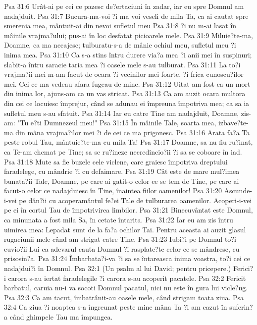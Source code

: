 Psa 31:6  Urât-ai pe cei ce pazesc de?ertaciuni în zadar, iar eu spre Domnul am nadajduit.
Psa 31:7  Bucura-ma-voi ?i ma voi veseli de mila Ta, ca ai cautat spre smerenia mea, mântuit-ai din nevoi sufletul meu
Psa 31:8  ?i nu m-ai lasat în mâinile vrajma?ului; pus-ai în loc desfatat picioarele mele.
Psa 31:9  Miluie?te-ma, Doamne, ca ma necajesc; tulburatu-s-a de mânie ochiul meu, sufletul meu ?i inima mea.
Psa 31:10  Ca s-a stins întru durere via?a mea ?i anii mei în suspinuri; slabit-a întru saracie taria mea ?i oasele mele s-au tulburat.
Psa 31:11  La to?i vrajma?ii mei m-am facut de ocara ?i vecinilor mei foarte, ?i frica cunoscu?ilor mei. Cei ce ma vedeau afara fugeau de mine.
Psa 31:12  Uitat am fost ca un mort din inima lor, ajuns-am ca un vas stricat.
Psa 31:13  Ca am auzit ocara multora din cei ce locuiesc împrejur, când se adunau ei împreuna împotriva mea; ca sa ia sufletul meu s-au sfatuit.
Psa 31:14  Iar eu catre Tine am nadajduit, Doamne, zis-am: "Tu e?ti Dumnezeul meu!"
Psa 31:15  În mâinile Tale, soarta mea, izbave?te-ma din mâna vrajma?ilor mei ?i de cei ce ma prigonesc.
Psa 31:16  Arata fa?a Ta peste robul Tau, mântuie?te-ma cu mila Ta!
Psa 31:17  Doamne, sa nu fiu ru?inat, ca Te-am chemat pe Tine; sa se ru?ineze necredincio?ii ?i sa se coboare în iad.
Psa 31:18  Mute sa fie buzele cele viclene, care graiesc împotriva dreptului faradelege, cu mândrie ?i cu defaimare.
Psa 31:19  Cât este de mare mul?imea bunata?ii Tale, Doamne, pe care ai gatit-o celor ce se tem de Tine, pe care ai facut-o celor ce nadajduiesc în Tine, înaintea fiilor oamenilor!
Psa 31:20  Ascunde-i-vei pe dân?ii cu acoperamântul fe?ei Tale de tulburarea oamenilor. Acoperi-i-vei pe ei în cortul Tau de împotrivirea limbilor.
Psa 31:21  Binecuvântat este Domnul, ca minunata a fost mila Sa, în cetate întarita.
Psa 31:22  Iar eu am zis întru uimirea mea: Lepadat sunt de la fa?a ochilor Tai. Pentru aceasta ai auzit glasul rugaciunii mele când am strigat catre Tine.
Psa 31:23  Iubi?i pe Domnul to?i cuvio?ii Lui ca adevarul cauta Domnul ?i rasplate?te celor ce se mândresc, cu prisosin?a.
Psa 31:24  Îmbarbata?i-va ?i sa se întareasca inima voastra, to?i cei ce nadajdui?i în Domnul.
Psa 32:1  (Un psalm al lui David; pentru pricepere.) Ferici?i carora s-au iertat faradelegile ?i carora s-au acoperit pacatele.
Psa 32:2  Fericit barbatul, caruia nu-i va socoti Domnul pacatul, nici nu este în gura lui vicle?ug.
Psa 32:3  Ca am tacut, îmbatrânit-au oasele mele, când strigam toata ziua.
Psa 32:4  Ca ziua ?i noaptea s-a îngreunat peste mine mâna Ta ?i am cazut în suferin?a când ghimpele Tau ma împungea.
